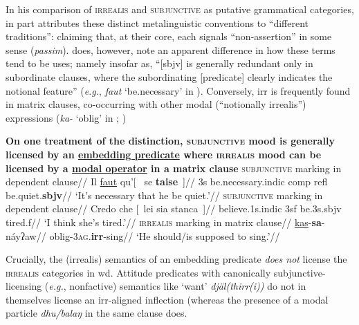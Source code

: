  In his comparison of \textsc{irrealis} and \textsc{subjunctive} as putative grammatical categories, \citet[185]{Palmer2001} in part attributes these distinct metalinguistic conventions to ``different traditions'': claiming that, at their core, each signals ``non-assertion'' in some sense (\textit{passim}). \citeauthor{Palmer2001} does, however, note an apparent difference in how these terms tend to be uses; namely insofar as, ``[\gls{sbjv}] is generally redundant only in subordinate clauses, where the subordinating [predicate] clearly indicates the notional feature'' (\textit{e.g.}, \textit{faut} `be.necessary' in ). Conversely, \gls{irr} is frequently found in matrix clauses, co-occurring with other modal (``notionally irrealis'') expressions (\textit{ka-} `\gls{oblig}' in ; \citeyear[186]{Palmer2001})

\pex{} \textbf{On one treatment of the distinction, \textsc{subjunctive} mood is generally licensed by an \ul{embedding predicate} where \textsc{irrealis} mood can be licensed by a \ul{modal operator} in a matrix clause}
\a\begingl\glpreamble{}\textsc{subjunctive} marking in dependent clause//
\gla Il \ul{faut} qu'\textup{[}~ se \textbf{taise}~\textup{]}//
\glb 3s be.necessary.\gls{indic} \gls{comp} \gls{refl} be.quiet.\textbf{\gls{sbjv}}//
\glft`It's necessary that he be quiet.'//\endgl
\a\begingl\glpreamble{}\textsc{subjunctive} marking in dependent clause//
\gla Credo che \textup{[}~lei sia stanca~\textup{]}//
\glb believe.1s.\gls{indic} 3sf be.3s.\gls{sbjv} tired.f//
\glft`I think she's tired.'//\endgl
\a\begingl\glpreamble {}  \textsc{irrealis} marking in matrix clause//
\gla \ul{kas}-\textbf{sa}-náyʔaw//
\glb \gls{oblig}-3\textsc{ag}.\textbf{\gls{irr}}-sing//
\glft`He should/is supposed to sing.'//\endgl
\xe


Crucially, the (irrealis) semantics of an embedding predicate \textit{does not} license the \textsc{irrealis} categories in \gls{wd}. Attitude predicates with canonically subjunctive-licensing (\textit{e.g.}, nonfactive) semantics like `want' \textit{djäl(thirr(i))} do not in themselves license an \gls{irr}-aligned inflection (whereas the presence of a modal particle \textit{dhu/balaŋ} in the same clause does.

